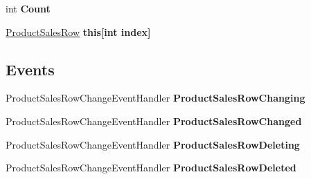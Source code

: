 \begin{DoxyCompactItemize}
\item 
int {\bfseries Count}\hypertarget{class_products_1_1_data_1_1ds_sage_1_1_product_sales_data_table_af214509ddf689b066a88cad619c270a5}{}\label{class_products_1_1_data_1_1ds_sage_1_1_product_sales_data_table_af214509ddf689b066a88cad619c270a5}

\item 
\hyperlink{class_products_1_1_data_1_1ds_sage_1_1_product_sales_row}{Product\+Sales\+Row} {\bfseries this\mbox{[}int index\mbox{]}}\hypertarget{class_products_1_1_data_1_1ds_sage_1_1_product_sales_data_table_a1bc7d03201f0d4b0414144da8b4748f5}{}\label{class_products_1_1_data_1_1ds_sage_1_1_product_sales_data_table_a1bc7d03201f0d4b0414144da8b4748f5}

\end{DoxyCompactItemize}
\subsection*{Events}
\begin{DoxyCompactItemize}
\item 
Product\+Sales\+Row\+Change\+Event\+Handler {\bfseries Product\+Sales\+Row\+Changing}\hypertarget{class_products_1_1_data_1_1ds_sage_1_1_product_sales_data_table_a3525214c7b62801da608c1e83d943855}{}\label{class_products_1_1_data_1_1ds_sage_1_1_product_sales_data_table_a3525214c7b62801da608c1e83d943855}

\item 
Product\+Sales\+Row\+Change\+Event\+Handler {\bfseries Product\+Sales\+Row\+Changed}\hypertarget{class_products_1_1_data_1_1ds_sage_1_1_product_sales_data_table_afcd8f5263dc2b5986805e4c5fbd73397}{}\label{class_products_1_1_data_1_1ds_sage_1_1_product_sales_data_table_afcd8f5263dc2b5986805e4c5fbd73397}

\item 
Product\+Sales\+Row\+Change\+Event\+Handler {\bfseries Product\+Sales\+Row\+Deleting}\hypertarget{class_products_1_1_data_1_1ds_sage_1_1_product_sales_data_table_a19a85308fe81e018c18fd8461a4ecdb3}{}\label{class_products_1_1_data_1_1ds_sage_1_1_product_sales_data_table_a19a85308fe81e018c18fd8461a4ecdb3}

\item 
Product\+Sales\+Row\+Change\+Event\+Handler {\bfseries Product\+Sales\+Row\+Deleted}\hypertarget{class_products_1_1_data_1_1ds_sage_1_1_product_sales_data_table_a7caee1d905de9363e72f85a1f47f2352}{}\label{class_products_1_1_data_1_1ds_sage_1_1_product_sales_data_table_a7caee1d905de9363e72f85a1f47f2352}

\end{DoxyCompactItemize}


